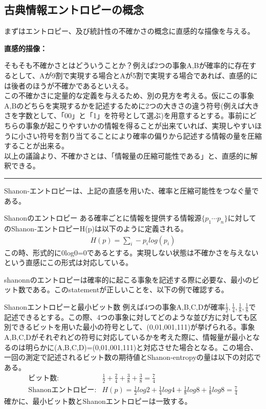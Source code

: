 \documentclass[a4paper,10.5pt]{article}
\numberwithin{equation}{section}
\newenvironment{intuitionbox}
{\begin{prooflabel}\textbf{直感的描像：}\end{prooflabel}\vspace{0.8em}}
{\par\vspace{1em}\hrule\vspace{1em}}
\begin{document}
\subsection{古典情報エントロピーの概念}
まずはエントロピー、及び統計性の不確かさの概念に直感的な描像を与える。
\begin{intuitionbox}
そもそも不確かさとはどういうことか？例えば2つの事象A,Bが確率的に存在するとして、Aが9割で実現する場合とAが5割で実現する場合であれば、直感的には後者のほうが不確かであるといえる。\\
この不確かさに定量的な定義を与えるため、別の見方を考える。仮にこの事象A,Bのどちらを実現するかを記述するために2つの大きさの違う符号(例えば大きさを字数として、「00」と「1」を符号として選ぶ)を用意するとする。事前にどちらの事象が起こりやすいかの情報を得ることが出来ていれば、実現しやすいほうに小さい符号を割り当てることにより確率の偏りから記述する情報の量を圧縮することが出来る。\\
以上の議論より、不確かさとは、「情報量の圧縮可能性である」と、直感的に解釈できる。
\end{intuitionbox}
Shanon-エントロピーは、上記の直感を用いた、確率と圧縮可能性をつなぐ量である。
\begin{defbox}{Shanonのエントロピー}
ある確率ごとに情報を提供する情報源$\{p_{1}\cdots p_{n}\}$に対してのShanon-エントロピーH(p)は以下のように定義される。
\begin{equation}\begin{split}
    H(p) = \sum_{i} - p_{i} log(p_{i})
\end{split} \end{equation}
この時、形式的に0log0=0であるとする。実現しない状態は不確かさを与えないという直感にこの形式は対応している。
\end{defbox}
 shanonnのエントロピーは確率的に起こる事象を記述する際に必要な、最小のビット数である。このstatementが正しいことを、以下の例で確認する。
\begin{examplebox}{Shanonエントロピーと最小ビット数}
例えば4つの事象A,B,C,Dが確率$\frac{1}{2},\frac{1}{4},\frac{1}{8},\frac{1}{8}$で記述できるとする。この際、4つの事象に対してどのような並び方に対しても区別できるビットを用いた最小の符号として、(0,01,001,111)が挙げられる。事象A,B,C,Dがそれぞれどの符号に対応しているかを考えた際に、情報量が最小となるのは明らかに(A,B,C,D)=(0,01,001,111)と対応させた場合となる。この場合、一回の測定で記述されるビット数の期待値とShanon-entropyの量は以下の対応である。
\begin{align*}
\text{ビット数}:&\frac{1}{2}+\frac{2}{4}+\frac{3}{8}+\frac{3}{8}=\frac{7}{4}\\
\text{Shanonエントロピー}:&H(p)=\frac{1}{2}log2+\frac{1}{4}log4+\frac{1}{8}log8+\frac{1}{8}log8=\frac{7}{4}
\end{align*}
確かに、最小ビット数とShanonエントロピーは一致する。
\end{examplebox}
\end{document}
